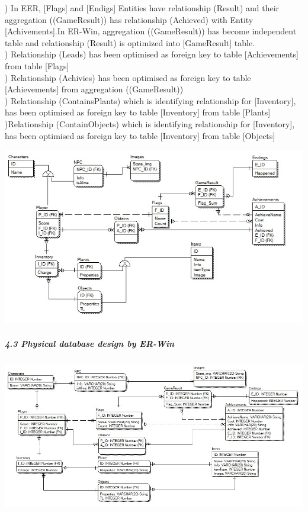 \documentclass[12pt,a4paper]{article}
\newcommand{\ind}{\indent\indent}
\begin{document}
\ind 3) In EER, [Flags] and [Endigs] Entities have relationship (Result) and their aggregation ((GameResult)) has relationship (Achieved) with Entity [Achivements].In ER-Win, aggregation ((GameResult)) has become independent table and relationship (Result) is optimized into [GameResult] table. \\
\ind 4) Relationship (Leads) has been optimised as foreign key to table [Achievements] from table [Flags]\\
\ind 5) Relationship (Achivies) has been optimised as foreign key to table [Achievements] from aggregation ((GameResult))\\
\ind 6) Relationship (ContainsPlants) which is identifying relationship for [Inventory], has been optimised as foreign key to table [Inventory] from table [Plants]\\
\ind 7)Relationship (ContainObjects) which is identifying relationship for [Inventory], has been optimised as foreign key to table [Inventory] from table [Objects]\\
\begin{center}
\includegraphics[scale=0.8]{images/Logical.jpg} 
\end{center}
\subparagraph{4.3 Physical database design by ER-Win\\}
\begin{center}
\includegraphics[scale=0.7]{images/Physical.jpg} 
\end{center}
\ind 
\newpage
\end{document}
